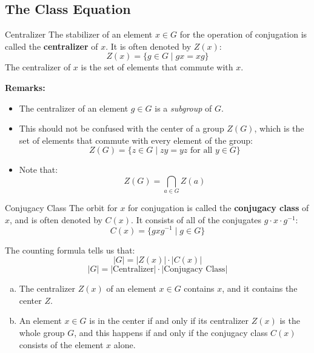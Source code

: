 \documentclass[letterpaper]{article}
\begin{document}
\subsection{The Class Equation}
\begin{definition}{Centralizer}{}
    The stabilizer of an element $x \in G$ for the operation of conjugation is called the \textbf{centralizer} of $x$. It is often denoted by $Z(x)$: 
    \[Z(x) = \{g \in G \mid gx = xg\}\]
    The centralizer of $x$ is the set of elements that commute with $x$. 
\end{definition}
\textbf{Remarks:}
\begin{itemize}
    \item The centralizer of an element $g \in G$ is a \emph{subgroup} of $G$. 
    \item This should not be confused with the center of a group $Z(G)$, which is the set of elements that commute with every element of the group: 
    \[Z(G) = \{z \in G \mid zy = yz \text{ for all } y \in G\}\]
    \item Note that: 
    \[Z(G) = \bigcap_{a \in G} Z(a)\]
\end{itemize}

\begin{definition}{Conjugacy Class}{}
    The orbit for $x$ for conjugation is called the \textbf{conjugacy class} of $x$, and is often denoted by $C(x)$. It consists of all of the conjugates $g \cdot x \cdot g^{-1}$:
    \[C(x) = \{gxg^{-1} \mid g \in G\}\]
\end{definition}

The counting formula tells us that: 
\[|G| = |Z(x)| \cdot |C(x)|\]
\[|G| = |\text{Centralizer}| \cdot |\text{Conjugacy Class}|\]

\begin{mdframed}
    \begin{proposition}
        \begin{enumerate}[(a)]
            \item The centralizer $Z(x)$ of an element $x \in G$ contains $x$, and it contains the center $Z$. 
            \item An element $x \in G$ is in the center if and only if its centralizer $Z(x)$ is the whole group $G$, and this happens if and only if the conjugacy class $C(x)$ consists of the element $x$ alone. 
        \end{enumerate}
    \end{proposition}
\end{mdframed}
\end{document}
